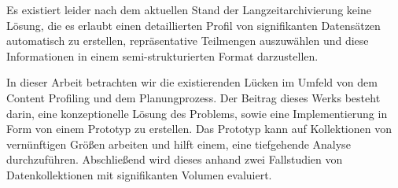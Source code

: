 Es existiert leider nach dem aktuellen Stand der Langzeitarchivierung keine L\"{o}sung, die es erlaubt einen detaillierten Profil von signifikanten Datens\"{a}tzen automatisch zu erstellen, repr\"{a}sentative Teilmengen auszuw\"{a}hlen und diese Informationen in einem semi-strukturierten Format darzustellen.

In dieser Arbeit betrachten wir die existierenden L\"{u}cken im Umfeld von dem Content Profiling und dem Planungprozess.
Der Beitrag dieses Werks besteht darin, eine konzeptionelle L\"{o}sung des Problems, sowie eine Implementierung in Form von einem Prototyp zu erstellen.
Das Prototyp kann auf Kollektionen von vern\"{u}nftigen Gr\"{o}{\ss}en arbeiten und hilft einem, eine tiefgehende Analyse durchzuf\"{u}hren.
Abschlie{\ss}end wird dieses anhand zwei Fallstudien von Datenkollektionen mit signifikanten Volumen evaluiert.

